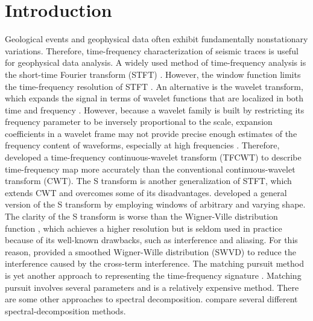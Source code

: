 \section{Introduction}
Geological events and geophysical data often exhibit fundamentally
nonstationary variations. Therefore, time-frequency characterization
of seismic traces is useful for geophysical data analysis. A widely
used method of time-frequency analysis is the short-time Fourier
transform (STFT) \cite[]{Allen77}. However, the window function limits
the time-frequency resolution of STFT
\cite[]{Cohen95}. An alternative is the wavelet transform, which expands the
signal in terms of wavelet functions that are
localized in both time and frequency \cite[]{Chakraborty95}. However,
because a wavelet family is built by restricting its frequency
parameter to be inversely proportional to the scale, expansion
coefficients in a wavelet frame may not provide precise enough
estimates of the frequency content of waveforms, especially at high
frequencies \cite[]{Wang07}. Therefore, \cite{Sinha05,Sinha09}
developed a time-frequency continuous-wavelet transform (TFCWT) to
describe time-frequency map more accurately than the conventional
continuous-wavelet transform (CWT). The S transform
\cite[]{Stockwell96} is another generalization of 
STFT, which extends
CWT and overcomes some of its disadvantages. \cite{Pinnegar03}
developed a general version of the S transform by employing windows of
arbitrary and varying shape. The clarity of the S transform is worse
than the Wigner-Ville distribution function \cite[]{Wigner32}, which
achieves a higher resolution but is seldom used in practice because of
its well-known drawbacks, such as interference and aliasing. For
this reason, \cite{Li08} provided a smoothed Wigner-Wille
distribution (SWVD) to reduce the interference caused by the
cross-term interference. The matching pursuit method is yet
another approach to representing the time-frequency signature
\cite[]{Liu07,Wang07,Wang10}. Matching pursuit involves several
parameters and is a relatively expensive method. There are some other
approaches to spectral decomposition. \cite{Castagna06} compare
several different spectral-decomposition methods.

